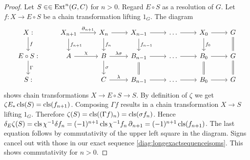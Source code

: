 \begin{proof}
Let $S \in\in \operatorname{Ext}^{n}(G,C)$ for $n>0$.
Regard $E \circ S$ as a resolution of $G$.
Let $f:X\to E\circ S$ be a chain transformation lifting $1_G$.
The diagram
\begin{equation*}
\begin{tikzcd}
X: \arrow{d}{f}&
X_{n+1}
	\arrow{r}{\bdd{n+1}}
	\arrow{d}{f_{n+1}}&
X_{n}
	\arrow{r}
	\arrow{d}{f_n}&
X_{n-1}
	\arrow{r}
	\arrow{d}{f_{n-1}}&
\dots
	\arrow{r}&
X_0
	\arrow{r}
	\arrow{d}{f_0}&
G
	\arrow[d, equal]
\\
E\circ S:\arrow{d}{\Gamma}&
A
	\arrow{r}{\chi}&
B
	\arrow{r}{\lambda\sigma}
	\arrow{d}{\sigma}&
B_{n-1}
	\arrow{r}
	\arrow[d,equal]&
\dots
	\arrow{r}&
B_0
	\arrow{r}
	\arrow[d,equal]&
G
	\arrow[d, equal]
\\
S:&
&
C
	\arrow{r}{\lambda}&
B_{n-1}
	\arrow{r}&
\dots
	\arrow{r}&
B_0
	\arrow{r}&
G
\end{tikzcd}
\end{equation*}
shows chain transformations $X\to E\circ S\to S$.
By definition of $\zeta$ we get $\zeta E_* \operatorname{cls}(S) = \operatorname{cls}(f_{n+1})$.
Composing $\Gamma f$ results in a chain transformation $X \to S$ lifting $1_G$.
Therefore $\zeta(S) = \operatorname{cls}((\Gamma f)_n) = \operatorname{cls}(\sigma f_n)$.
Hence $\delta_E \zeta(S)= \operatorname{cls} \chi^{-1}\delta f_n = (-1)^{n+1} \operatorname{cls} \chi^{-1} f_n \operatorname{\partial}_{n+1} = (-1)^{n+1} \operatorname{cls} (f_{n+1})$.
The last equation follows by commutativity of the upper left square in the diagram.
Signs cancel out with those in our exact sequence \eqref{diag:longexactsequenceisoms}.
This shows commutativity for $n>0$.
\end{proof}